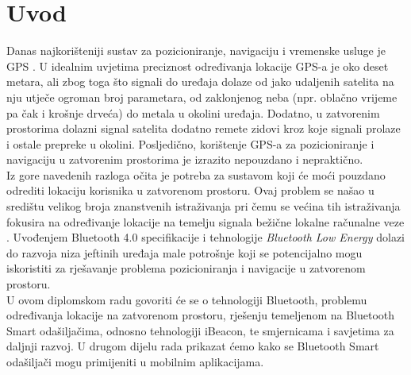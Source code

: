 \chapter{Uvod}

Danas najkorišteniji sustav za pozicioniranje, navigaciju i vremenske usluge je GPS . %
U idealnim uvjetima preciznost određivanja lokacije GPS-a je oko deset metara, ali zbog toga što signali do uređaja dolaze od jako udaljenih satelita na nju utječe ogroman broj parametara, od zaklonjenog neba (npr. oblačno vrijeme pa čak i krošnje drveća) do metala u okolini uređaja. %
Dodatno, u zatvorenim prostorima dolazni signal satelita dodatno remete zidovi kroz koje signali prolaze i ostale prepreke u okolini.
Posljedično, korištenje GPS-a za pozicioniranje i navigaciju u zatvorenim prostorima je izrazito nepouzdano i nepraktično.
\\

Iz gore navedenih razloga očita je potreba za sustavom koji će moći pouzdano odrediti lokaciju korisnika u zatvorenom prostoru. 
Ovaj problem se našao u središtu velikog broja znanstvenih istraživanja pri čemu se većina tih istraživanja fokusira na određivanje lokacije na temelju signala bežične lokalne računalne veze . %
Uvođenjem Bluetooth 4.0 specifikacije i tehnologije \textit{Bluetooth Low Energy} dolazi do razvoja niza jeftinih uređaja male potrošnje koji se potencijalno mogu iskoristiti za rješavanje problema pozicioniranja i navigacije u zatvorenom prostoru.
\\

U ovom diplomskom radu govoriti će se o tehnologiji Bluetooth, problemu određivanja lokacije na zatvorenom prostoru, rješenju temeljenom na Bluetooth Smart odašiljačima, odnosno tehnologiji iBeacon, te smjernicama i savjetima za daljnji razvoj. 
U drugom dijelu rada prikazat ćemo kako se Bluetooth Smart odašiljači mogu primijeniti u mobilnim aplikacijama.